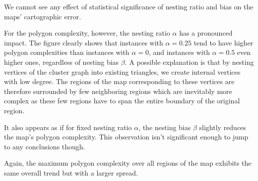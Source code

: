 We cannot see any effect of statistical significance of nesting ratio and bias on the maps' cartographic error.

For the polygon complexity, however, the nesting ratio $\alpha$ has a pronounced impact.
The figure clearly shows that instances with $\alpha = 0.25$ tend to have higher polygon complexities than instances with $\alpha = 0$, and instances with $\alpha = 0.5$ even higher ones, regardless of nesting bias $\beta$.
A possible explanation is that by nesting vertices of the cluster graph into existing triangles, we create internal vertices with low degree.
The regions of the map corresponding to these vertices are therefore surrounded by few neighboring regions which are inevitably more complex as these few regions have to span the entire boundary of the original region.

It also appears as if for fixed nesting ratio $\alpha$, the nesting bias $\beta$ slightly reduces the map's polygon complexity.
This observation isn't significant enough to jump to any conclusions though.

Again, the maximum polygon complexity over all regions of the map exhibits the same overall trend but with a larger spread.




\clearpage
{}

